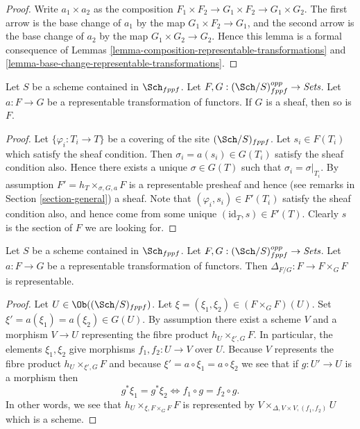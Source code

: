 \begin{proof}
Write $a_1 \times a_2$ as the composition
$F_1 \times F_2 \to G_1 \times F_2 \to G_1 \times G_2$.
The first arrow is the base change of $a_1$ by the map
$G_1 \times F_2 \to G_1$, and the second arrow
is the base change of $a_2$ by the map
$G_1 \times G_2 \to G_2$. Hence this lemma is a formal
consequence of Lemmas \ref{lemma-composition-representable-transformations}
and \ref{lemma-base-change-representable-transformations}.
\end{proof}

\begin{lemma}
\label{lemma-representable-transformation-to-sheaf}
Let $S$ be a scheme contained in $\Sch_{fppf}$.
Let $F, G : (\Sch/S)_{fppf}^{opp} \to \textit{Sets}$.
Let $a : F \to G$ be a representable transformation of functors.
If $G$ is a sheaf, then so is $F$.
\end{lemma}

\begin{proof}
Let $\{\varphi_i : T_i \to T\}$ be a covering of the site
$(\Sch/S)_{fppf}$.
Let $s_i \in F(T_i)$ which satisfy the sheaf condition.
Then $\sigma_i = a(s_i) \in G(T_i)$ satisfy the sheaf condition
also. Hence there exists a unique $\sigma \in G(T)$ such
that $\sigma_i = \sigma|_{T_i}$. By assumption
$F' = h_T \times_{\sigma, G, a} F$ is a representable presheaf
and hence (see remarks in Section \ref{section-general}) a sheaf.
Note that $(\varphi_i, s_i) \in F'(T_i)$ satisfy the
sheaf condition also, and hence come from some unique
$(\text{id}_T, s) \in F'(T)$. Clearly $s$ is the section of
$F$ we are looking for.
\end{proof}

\begin{lemma}
\label{lemma-representable-transformation-diagonal}
Let $S$ be a scheme contained in $\Sch_{fppf}$.
Let $F, G : (\Sch/S)_{fppf}^{opp} \to \textit{Sets}$.
Let $a : F \to G$ be a representable transformation of functors.
Then $\Delta_{F/G} : F \to F \times_G F$ is representable.
\end{lemma}

\begin{proof}
Let $U \in \Ob((\Sch/S)_{fppf})$. Let
$\xi = (\xi_1, \xi_2) \in (F \times_G F)(U)$.
Set $\xi' = a(\xi_1) = a(\xi_2) \in G(U)$.
By assumption there exist a scheme $V$ and a morphism $V \to U$
representing the fibre product $h_U \times_{\xi', G} F$.
In particular, the elements $\xi_1, \xi_2$ give morphisms
$f_1, f_2 : U \to V$ over $U$. Because $V$ represents the
fibre product $h_U \times_{\xi', G} F$ and because
$\xi' = a \circ \xi_1 = a \circ \xi_2$
we see that if $g : U' \to U$ is a morphism then
$$
g^*\xi_1 = g^*\xi_2
\Leftrightarrow
f_1 \circ g = f_2 \circ g.
$$
In other words, we see that $h_U \times_{\xi, F \times_G F} F$
is represented by $V \times_{\Delta, V \times V, (f_1, f_2)} U$
which is a scheme.
\end{proof}










